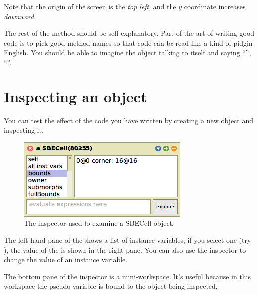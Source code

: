 \documentclass[a4paper,10pt,twoside]{book}
\begin{document}
Note that the origin of the \sq screen is the \emph{top left}, and the $y$ coordinate increases \emph{downward}.

The rest of the method should be self-explanatory.
Part of the art of writing good \st code is to pick good method names so that \st code can be read like a kind of pidgin English.
You should be able to imagine the object talking to itself and saying ``'', ``''.

\section{Inspecting an object}

You can test the effect of the code you have written by creating a new  object and inspecting it.


\begin{figure}[htbp]
   \centering
   \includegraphics[scale=0.7]{SBECellInspector} 
   \caption{The inspector used to examine a SBECell object.\label{fig:SBECellInspector}}
\end{figure}

The left-hand pane of the  shows a list of instance variables; if you select one (try \mbox{),} the value of the  is shown in the right pane.
You can also use the inspector to change the value of an instance variable.


The bottom pane of the inspector is a mini-workspace.
It's useful because in this workspace the pseudo-variable \self is bound to the object being inspected. 
\end{document}
